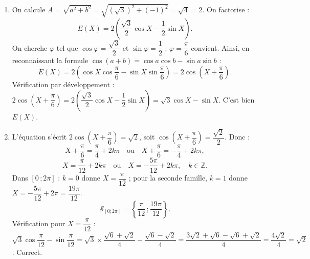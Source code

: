 \documentclass[11pt]{article}
\begin{document}
\begin{corrige}
\begin{enumerate}
\item On calcule $A=\sqrt{a^2+b^2}=\sqrt{(\sqrt{3})^2+(-1)^2}=\sqrt{4}=2$. On factorise :
\[E(X)=2\left(\dfrac{\sqrt{3}}{2}\cos X-\dfrac{1}{2}\sin X\right).\]
On cherche $\varphi$ tel que $\cos\varphi=\dfrac{\sqrt{3}}{2}$ et $\sin\varphi=\dfrac{1}{2}$ : $\varphi=\dfrac{\pi}{6}$ convient. Ainsi, en reconnaissant la formule $\cos(a+b)=\cos a\cos b-\sin a\sin b$ :
\[E(X)=2\left(\cos X\cos\dfrac{\pi}{6}-\sin X\sin\dfrac{\pi}{6}\right)=2\cos\left(X+\dfrac{\pi}{6}\right).\]
Vérification par développement : $2\cos\left(X+\dfrac{\pi}{6}\right)=2\left(\dfrac{\sqrt{3}}{2}\cos X-\dfrac{1}{2}\sin X\right)=\sqrt{3}\cos X-\sin X$. C'est bien $E(X)$.
\item L'équation s'écrit $2\cos\left(X+\dfrac{\pi}{6}\right)=\sqrt{2}$, soit $\cos\left(X+\dfrac{\pi}{6}\right)=\dfrac{\sqrt{2}}{2}$. Donc :
\[X+\dfrac{\pi}{6}=\dfrac{\pi}{4}+2k\pi\quad\text{ou}\quad X+\dfrac{\pi}{6}=-\dfrac{\pi}{4}+2k\pi,\]
\[X=\dfrac{\pi}{12}+2k\pi\quad\text{ou}\quad X=-\dfrac{5\pi}{12}+2k\pi,\quad k\in\mathbb{Z}.\]
Dans $[0\,;2\pi]$ : $k=0$ donne $X=\dfrac{\pi}{12}$ ; pour la seconde famille, $k=1$ donne $X=-\dfrac{5\pi}{12}+2\pi=\dfrac{19\pi}{12}$.
\[\mathcal{S}_{[0;2\pi]}=\left\{\dfrac{\pi}{12}\,;\dfrac{19\pi}{12}\right\}.\]
Vérification pour $X=\dfrac{\pi}{12}$ : $\sqrt{3}\cos\dfrac{\pi}{12}-\sin\dfrac{\pi}{12}=\sqrt{3}\times\dfrac{\sqrt{6}+\sqrt{2}}{4}-\dfrac{\sqrt{6}-\sqrt{2}}{4}=\dfrac{3\sqrt{2}+\sqrt{6}-\sqrt{6}+\sqrt{2}}{4}=\dfrac{4\sqrt{2}}{4}=\sqrt{2}$. Correct.
\end{enumerate}
\end{corrige}
\end{document}
